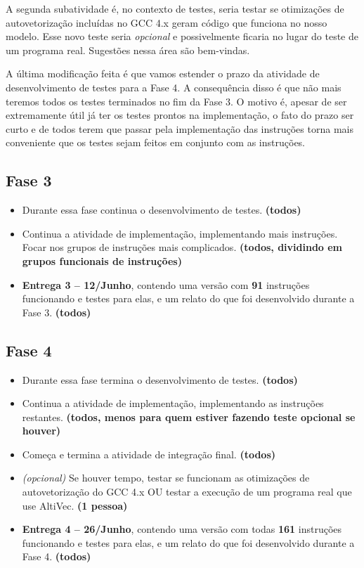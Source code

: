 \documentclass[twocolumn]{article}
\newcommand{\who}[1]{\textbf{ (#1)}}
\begin{document}
A segunda subatividade é, no contexto de testes, seria testar se otimizações de
autovetorização incluídas no GCC 4.x geram código que funciona no nosso modelo.
Esse novo teste seria \emph{opcional} e possivelmente ficaria no lugar do teste
de um programa real. Sugestões nessa área são bem-vindas.

A última modificação feita é que vamos estender o prazo da atividade de
desenvolvimento de testes para a Fase 4. A consequência disso é que não mais
teremos todos os testes terminados no fim da Fase 3. O motivo é, apesar de ser
extremamente útil já ter os testes prontos na implementação, o fato do prazo
ser curto e de todos terem que passar pela implementação das instruções torna
mais conveniente que os testes sejam feitos em conjunto com as instruções.

\subsection{Fase 3}

\begin{itemize}

\item Durante essa fase continua o desenvolvimento de testes. \who{todos}

\item Continua a atividade de implementação, implementando mais instruções.
Focar nos grupos de instruções mais complicados. \who{todos, dividindo
em grupos funcionais de instruções}

\item \textbf{Entrega 3 -- 12/Junho}, contendo uma versão com \textbf{91}
instruções funcionando e testes para elas, e um relato do que foi desenvolvido
durante a Fase 3.\who{todos}

\end{itemize}


\subsection{Fase 4}

\begin{itemize}

\item Durante essa fase termina o desenvolvimento de testes. \who{todos}

\item Continua a atividade de implementação, implementando as instruções
restantes. \who{todos, menos para quem estiver fazendo teste opcional se
houver}

\item Começa e termina a atividade de integração final. \who{todos}

\item \emph{(opcional)} Se houver tempo, testar se funcionam as otimizações de
autovetorização do GCC 4.x OU testar a execução de um programa real que use
AltiVec. \who{1 pessoa}

\item \textbf{Entrega 4 -- 26/Junho}, contendo uma versão com todas
\textbf{161} instruções funcionando e testes para elas, e um relato do que foi
desenvolvido durante a Fase 4. \who{todos}

\end{itemize}
\end{document}
